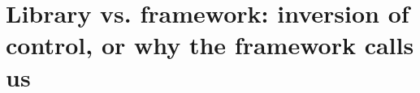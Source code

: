 \chapter{Library vs. framework: inversion of control, or why the framework calls us}
\label{ch:library-vs-framework-inversion-of}

